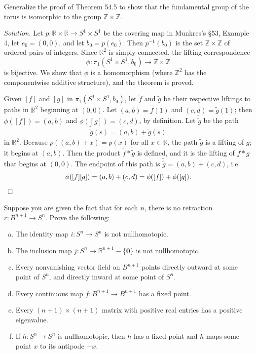 \documentclass[10pt]{article}
\providecommand{\RR}{\mathbb R}
\providecommand{\ZZ}{\mathbb Z}
\providecommand{\ii}{\item}
\providecommand{\inv}{^{-1}}
\providecommand{\mb}[1]{\mathbf{#1}}
\newenvironment{soln}{\begin{proof}[Solution]}{\end{proof}}
\begin{document}
\begin{problem}
    Generalize the proof of Theorem 54.5 to show that
    the fundamental group of the torus is isomorphic to the group $\ZZ\times\ZZ$.
\end{problem}

\begin{soln}
    Let $p\colon\RR\times\RR\to S^1\times S^1$ be the covering map
    in Munkres's \S53, Example 4, let $e_0 = (0,0)$,
    and let $b_0 = p(e_0)$. Then $p\inv(b_0)$ is the set
    $\ZZ\times\ZZ$ of ordered pairs of integers. Since $\RR^2$
    is simply connected, the lifting correspondence
    \begin{equation*}
        \phi\colon\pi_1(S^1\times S^1, b_0)\to\ZZ\times\ZZ
    \end{equation*}
    is bijective. We show that $\phi$ is a homomorphism
    (where $\ZZ^2$ has the componentwise additive structure),
    and the theorem is proved.

    Given $[f]$ and $[g]$ in $\pi_1(S^1\times S^1,b_0)$,
    let $\widetilde f$ and $\widetilde g$ be their respective liftings
    to paths in $\RR^2$ beginning at $(0,0)$.
    Let $(a,b) = \widetilde f(1)$ and $(c,d) = \widetilde g(1)$;
    then $\phi([f]) = (a,b)$ and $\phi([g]) = (c,d)$, by definition.
    Let $\widetilde{\widetilde g}$ be the path
    \begin{equation*}
	\widetilde{\widetilde g}(s) = (a,b) + \widetilde g(s)
    \end{equation*}
    in $\RR^2$. Because $p((a,b) + x) = p(x)$ for all $x\in\RR$,
    the path $\widetilde{\widetilde g}$ is a lifting of $g$;
    it begins at $(a,b)$. Then the product $\widetilde f * \widetilde{\widetilde g}$
    is defined, and it is the lifting of $f*g$ that begins at $(0,0)$.
    The endpoint of this path is $\widetilde{\widetilde g} = (a,b)+(c,d)$, i.e.
    \begin{equation*}
	\phi([f][g]) = (a,b) + (c,d) = \phi([f]) + \phi([g]).\qedhere
    \end{equation*}
\end{soln}

\pagebreak
\begin{problem}
    [Munkres 55.4]
    Suppose you are given the fact that for each $n$,
    there is no retraction $r\colon B^{n+1}\to S^n$. Prove the following:
    \begin{enumerate}[(a)]
        \ii The identity map $i\colon S^n\to S^n$ is not nullhomotopic.
	\ii The inclusion map $j\colon S^n\to\RR^{n+1} - \{\mb 0\}$
	is not nullhomotopic.
	\ii Every nonvanishing vector field on $B^{n+1}$
	points directly outward at some point of $S^n$,
	and directly inward at some point of $S^n$.
	\ii Every continuous map $f\colon B^{n+1}\to B^{n+1}$
	has a fixed point.
	\ii Every $(n+1)\times(n+1)$ matrix with positive real entries
	has a positive eigenvalue.
	\ii If $h\colon S^n\to S^n$ is nullhomotopic, then
	$h$ has a fixed point and $h$ maps some point $x$
	to its antipode $-x$.
    \end{enumerate}
\end{problem}
\end{document}

